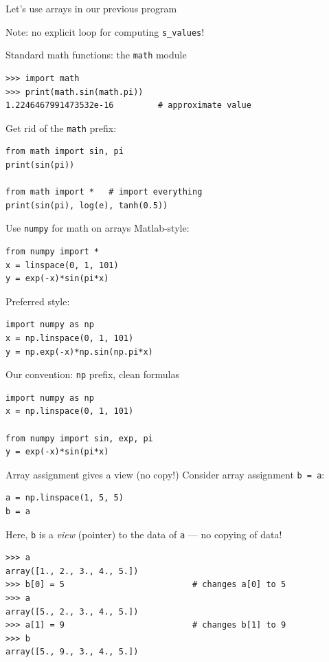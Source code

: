 \begin{frame}[fragile]{Let's use arrays in our previous program}

  Note: no explicit loop for computing \texttt{s\_values}!
\end{frame}

\begin{frame}[fragile]{Standard math functions: the \texttt{math} module}
\begin{lstlisting}[style=pythoncompact]
>>> import math
>>> print(math.sin(math.pi))
1.2246467991473532e-16         # approximate value
\end{lstlisting}
  Get rid of the \texttt{math} prefix:
\begin{lstlisting}[style=pythoncompact]
from math import sin, pi
print(sin(pi))

from math import *   # import everything
print(sin(pi), log(e), tanh(0.5))
\end{lstlisting}
\end{frame}

\begin{frame}[fragile]{Use \texttt{numpy} for math on arrays}
  Matlab-style:
\begin{lstlisting}[style=pythoncompact]
from numpy import *
x = linspace(0, 1, 101)
y = exp(-x)*sin(pi*x)
\end{lstlisting}
  Preferred style:
\begin{lstlisting}[style=pythoncompact]
import numpy as np
x = np.linspace(0, 1, 101)
y = np.exp(-x)*np.sin(np.pi*x)
\end{lstlisting}
\end{frame}

\begin{frame}[fragile]{Our convention: \texttt{np} prefix, clean formulas}
\begin{lstlisting}[style=pythoncompact]
import numpy as np
x = np.linspace(0, 1, 101)

from numpy import sin, exp, pi
y = exp(-x)*sin(pi*x)
\end{lstlisting}
\end{frame}

\begin{frame}[fragile]{Array assignment gives a view (no copy!)}
  Consider array assignment \texttt{b = a}:
\begin{lstlisting}[style=pythoncompact]
a = np.linspace(1, 5, 5)
b = a
\end{lstlisting}
  Here, \texttt{b} is a \emph{view} (pointer) to the data of \texttt{a} ---
  no copying of data!
\begin{lstlisting}[style=pythonTiny]
>>> a
array([1., 2., 3., 4., 5.])
>>> b[0] = 5                          # changes a[0] to 5
>>> a
array([5., 2., 3., 4., 5.])
>>> a[1] = 9                          # changes b[1] to 9
>>> b
array([5., 9., 3., 4., 5.])
\end{lstlisting}
\end{frame}

